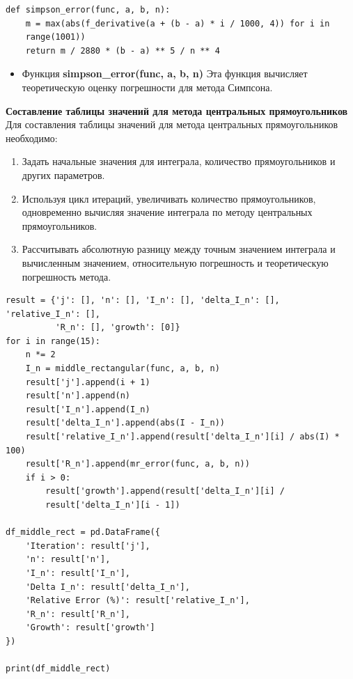 \documentclass{article}
\begin{document}
\begin{lstlisting}
def simpson_error(func, a, b, n):
    m = max(abs(f_derivative(a + (b - a) * i / 1000, 4)) for i in
    range(1001))
    return m / 2880 * (b - a) ** 5 / n ** 4
\end{lstlisting}

\begin{itemize}
\item Функция \textbf{simpson\_error(func, a, b, n)} Эта функция вычисляет теоретическую оценку погрешности для метода Симпсона.
\end{itemize}

\textbf{\large{Составление таблицы значений для метода центральных прямоугольников
}} \\

Для составления таблицы значений для метода центральных прямоугольников необходимо:
\begin{enumerate}
\item Задать начальные значения для интеграла, количество прямоугольников и других параметров.
\item Используя цикл итераций, увеличивать количество прямоугольников, одновременно вычисляя значение интеграла по методу центральных прямоугольников.
\item Рассчитывать абсолютную разницу между точным значением интеграла и вычисленным значением, относительную погрешность и теоретическую погрешность метода.

\end{enumerate}

\begin{lstlisting}
result = {'j': [], 'n': [], 'I_n': [], 'delta_I_n': [], 'relative_I_n': [],
          'R_n': [], 'growth': [0]}
for i in range(15):
    n *= 2
    I_n = middle_rectangular(func, a, b, n)
    result['j'].append(i + 1)
    result['n'].append(n)
    result['I_n'].append(I_n)
    result['delta_I_n'].append(abs(I - I_n))
    result['relative_I_n'].append(result['delta_I_n'][i] / abs(I) * 100)
    result['R_n'].append(mr_error(func, a, b, n))
    if i > 0:
        result['growth'].append(result['delta_I_n'][i] /
        result['delta_I_n'][i - 1])

df_middle_rect = pd.DataFrame({
    'Iteration': result['j'],
    'n': result['n'],
    'I_n': result['I_n'],
    'Delta I_n': result['delta_I_n'],
    'Relative Error (%)': result['relative_I_n'],
    'R_n': result['R_n'],
    'Growth': result['growth']
})

print(df_middle_rect)
\end{lstlisting}
\end{document}
